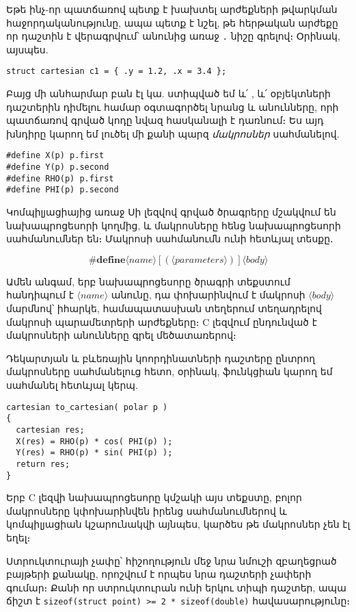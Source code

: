 Եթե ինչ-որ պատճառով պետք է խախտել արժեքների թվարկման հաջորդականությունը,
ապա պետք է նշել, թե հերթական արժեքը որ դաշտին է վերագրվում՝ անունից առաջ
\Verb|.| նիշը գրելով։ Օրինակ, այսպես.

\begin{Verbatim}
struct cartesian c1 = { .y = 1.2, .x = 3.4 };
\end{Verbatim}

Բայց մի անհարմար բան էլ կա. ստիպված եմ և՛ , և՛
 օբյեկտների դաշտերին դիմելու համար օգտագործել նրանց
 և  անունները, որի պատճառով գրված կոդը նվազ
հասկանալի է դառնում։ Ես այդ խնդիրը կարող եմ լուծել մի քանի պարզ
\emph{մակրոսներ} սահմանելով.

\begin{Verbatim}
#define X(p) p.first
#define Y(p) p.second
#define RHO(p) p.first
#define PHI(p) p.second
\end{Verbatim}

Կոմպիլյացիայից առաջ Սի լեզվով գրված ծրագրերը մշակվում են նախապրոցեսորի
կողմից, և մակրոսները հենց նախապրոցեսորի սահմանումներ են։ Մակրոսի
սահմանումն ունի հետևյալ տեսքը․

\[
\mathbf{\#define} \langle name\rangle[(\langle parameters\rangle)] \langle body\rangle
\]

Ամեն անգամ, երբ նախապրոցեսորը ծրագրի տեքստում հանդիպում է
\(\langle name\rangle\) անունը, դա փոխարինվում է մակրոսի
\(\langle body\rangle\) մարմնով՝ իհարկե, համապատասխան տեղերում տեղադրելով
մակրոսի պարամետրերի արժեքները։ C լեզվում ընդունված է մակրոսների անունները
գրել մեծատառերով։

Դեկարտյան և բևեռային կոորդինատների դաշտերը ընտրող մակրոսները սահմանելուց
հետո, օրինակ,  ֆունկցիան կարող եմ սահմանել հետևյալ կերպ.

\begin{Verbatim}
cartesian to_cartesian( polar p )
{
  cartesian res;
  X(res) = RHO(p) * cos( PHI(p) );
  Y(res) = RHO(p) * sin( PHI(p) );
  return res;
}
\end{Verbatim}

Երբ C լեզվի նախապրոցեսորը կմշակի այս տեքստը, բոլոր մակրոսները կփոխարինվեն
իրենց սահմանումներով և կոմպիլյացիան կշարունակվի այնպես, կարծես թե մակրոսներ
չեն էլ եղել։

Ստրուկտուրայի չափը՝ հիշողություն մեջ նրա նմուշի զբաղեցրած բայթերի քանակը,
որոշվում է որպես նրա դաշտերի չափերի գումար։ Քանի որ 
ստրուկտուրան ունի երկու  տիպի դաշտեր, ապա ճիշտ է
\texttt{sizeof(struct point) >= 2 * sizeof(double)} հավասարությունը։
